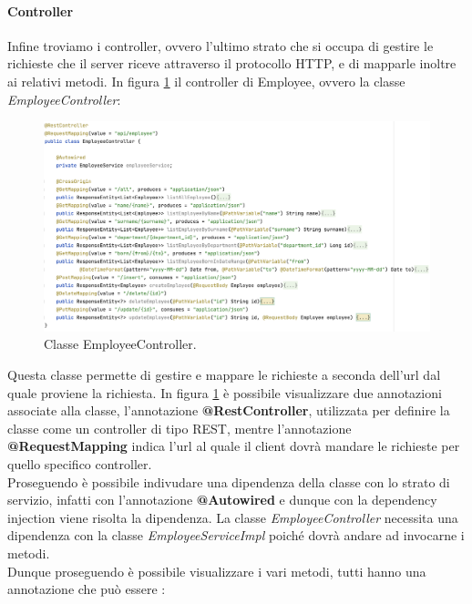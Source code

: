 \paragraph{Controller}
Infine troviamo i controller, ovvero l'ultimo strato che si occupa di gestire le richieste che il server riceve attraverso il protocollo HTTP, e di mapparle inoltre ai relativi metodi. In figura \ref{employeeController} il controller di Employee, ovvero la classe \textit{EmployeeController}:
\FloatBarrier
\begin{figure}[!ht]
\begin{mdframed}
\centering
\includegraphics[width=1\linewidth]{immagini/EmployeeController.png}
\end{mdframed}
\caption{Classe EmployeeController.}
\label{employeeController}
\end{figure}
\FloatBarrier
Questa classe permette di gestire e mappare le richieste a seconda dell'url dal quale proviene la richiesta. In figura \ref{employeeController} è possibile visualizzare due annotazioni associate alla classe, l'annotazione \textbf{@RestController}, utilizzata per definire la classe come un controller di tipo REST, mentre l'annotazione \textbf{@RequestMapping} indica l'url al quale il client dovrà mandare le richieste per quello specifico controller.\\
Proseguendo è possibile indivudare una dipendenza della classe con lo strato di servizio, infatti con l'annotazione \textbf{@Autowired} e dunque con la dependency injection viene risolta la dipendenza. La classe \textit{EmployeeController} necessita una dipendenza con la classe \textit{EmployeeServiceImpl} poiché dovrà andare ad invocarne i metodi.\\
Dunque proseguendo è possibile visualizzare i vari metodi, tutti hanno una annotazione che può essere :
